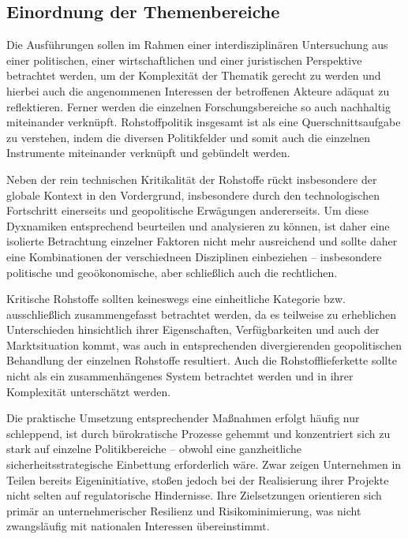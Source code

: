 \documentclass[12pt,a4paper,oneside]{book} %
\begin{document}
	
	
	\subsection{Einordnung der Themenbereiche}
	Die Ausführungen sollen im Rahmen einer interdisziplinären Untersuchung aus einer politischen, einer wirtschaftlichen und einer juristischen Perspektive betrachtet werden, um der Komplexität der Thematik gerecht zu werden und hierbei auch die angenommenen Interessen der betroffenen Akteure adäquat zu reflektieren. Ferner werden die einzelnen Forschungsbereiche so auch nachhaltig miteinander verknüpft. Rohstoffpolitik insgesamt ist als eine Querschnittsaufgabe zu verstehen, indem die diversen Politikfelder und somit auch die einzelnen Instrumente miteinander verknüpft und gebündelt werden.\autocite{KAS: Vom Dialog zur Lieferkette, S. 49}
	
	Neben der rein technischen Kritikalität der Rohstoffe rückt insbesondere der globale Kontext in den Vordergrund, insbesondere durch den technologischen Fortschritt einerseits und geopolitische Erwägungen andererseits. Um diese Dyxnamiken entsprechend beurteilen und analysieren zu können, ist daher eine isolierte Betrachtung einzelner Faktoren nicht mehr ausreichend und sollte daher eine Kombinationen der verschiedneen Disziplinen einbeziehen -- insbesondere politische und geoökonomische, aber schließlich auch die rechtlichen.
	
	Kritische Rohstoffe sollten keineswegs eine einheitliche Kategorie bzw. ausschließlich zusammengefasst betrachtet werden, da es teilweise zu erheblichen Unterschieden hinsichtlich ihrer Eigenschaften, Verfügbarkeiten und auch der Marktsituation kommt, was auch in entsprechenden divergierenden geopolitischen Behandlung der einzelnen Rohstoffe resultiert.\autocite{UI Report} Auch die Rohstofflieferkette sollte nicht als ein zusammenhängenes System betrachtet werden und in ihrer Komplexität unterschätzt werden.\autocite{UI Report}
	
	Die praktische Umsetzung entsprechender Maßnahmen erfolgt häufig nur schleppend, ist durch bürokratische Prozesse gehemmt und konzentriert sich zu stark auf einzelne Politikbereiche – obwohl eine ganzheitliche sicherheitsstrategische Einbettung erforderlich wäre. Zwar zeigen Unternehmen in Teilen bereits Eigeninitiative, stoßen jedoch bei der Realisierung ihrer Projekte nicht selten auf regulatorische Hindernisse. Ihre Zielsetzungen orientieren sich primär an unternehmerischer Resilienz und Risikominimierung, was nicht zwangsläufig mit nationalen Interessen übereinstimmt.
	
\end{document}
